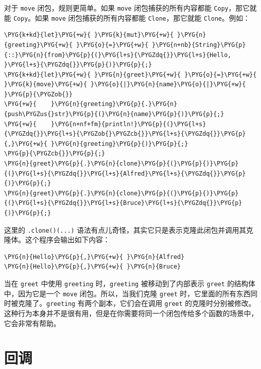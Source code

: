 对于 \texttt{move} 闭包，规则更简单。如果 \texttt{move} 闭包捕获的所有内容都能 \texttt{Copy}，那它就能 \texttt{Copy}。如果 \texttt{move} 闭包捕获的所有内容都能 \texttt{Clone}，那它就能 \texttt{Clone}。例如：

\begin{Verbatim}[commandchars=\\\{\},breaklines=true,breakanywhere=true,fontsize=\codefont,xleftmargin=17bp]
\PYG{k+kd}{let}\PYG{+w}{ }\PYG{k}{mut}\PYG{+w}{ }\PYG{n}{greeting}\PYG{+w}{ }\PYG{o}{=}\PYG{+w}{ }\PYG{n+nb}{String}\PYG{p}{::}\PYG{n}{from}\PYG{p}{(}\PYG{l+s}{\PYGZdq{}}\PYG{l+s}{Hello, }\PYG{l+s}{\PYGZdq{}}\PYG{p}{)}\PYG{p}{;}
\PYG{k+kd}{let}\PYG{+w}{ }\PYG{n}{greet}\PYG{+w}{ }\PYG{o}{=}\PYG{+w}{ }\PYG{k}{move}\PYG{+w}{ }\PYG{o}{|}\PYG{n}{name}\PYG{o}{|}\PYG{+w}{ }\PYG{p}{\PYGZob{}}
\PYG{+w}{    }\PYG{n}{greeting}\PYG{p}{.}\PYG{n}{push\PYGZus{}str}\PYG{p}{(}\PYG{n}{name}\PYG{p}{)}\PYG{p}{;}
\PYG{+w}{    }\PYG{n+nf+fm}{println!}\PYG{p}{(}\PYG{l+s}{\PYGZdq{}}\PYG{l+s}{\PYGZob{}\PYGZcb{}}\PYG{l+s}{\PYGZdq{}}\PYG{p}{,}\PYG{+w}{ }\PYG{n}{greeting}\PYG{p}{)}\PYG{p}{;}
\PYG{p}{\PYGZcb{}}\PYG{p}{;}
\PYG{n}{greet}\PYG{p}{.}\PYG{n}{clone}\PYG{p}{(}\PYG{p}{)}\PYG{p}{(}\PYG{l+s}{\PYGZdq{}}\PYG{l+s}{Alfred}\PYG{l+s}{\PYGZdq{}}\PYG{p}{)}\PYG{p}{;}
\PYG{n}{greet}\PYG{p}{.}\PYG{n}{clone}\PYG{p}{(}\PYG{p}{)}\PYG{p}{(}\PYG{l+s}{\PYGZdq{}}\PYG{l+s}{Bruce}\PYG{l+s}{\PYGZdq{}}\PYG{p}{)}\PYG{p}{;}
\end{Verbatim}

这里的 \texttt{.clone()(...)} 语法有点儿奇怪，其实它只是表示克隆此闭包并调用其克隆体。这个程序会输出如下内容：

\begin{Verbatim}[commandchars=\\\{\},breaklines=true,breakanywhere=true,fontsize=\codefont,xleftmargin=17bp]
\PYG{n}{Hello}\PYG{p}{,}\PYG{+w}{ }\PYG{n}{Alfred}
\PYG{n}{Hello}\PYG{p}{,}\PYG{+w}{ }\PYG{n}{Bruce}
\end{Verbatim}

当在 \texttt{greet} 中使用 \texttt{greeting} 时，\texttt{greeting} 被移动到了内部表示 \texttt{greet} 的结构体中，因为它是一个 \texttt{move} 闭包。所以，当我们克隆 \texttt{greet} 时，它里面的所有东西同时被克隆了。\texttt{greeting} 有两个副本，它们会在调用 \texttt{greet} 的克隆时分别被修改。这种行为本身并不是很有用，但是在你需要将同一个闭包传给多个函数的场景中，它会非常有帮助。

\section{回调}


